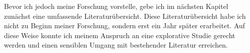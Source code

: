 Bevor ich jedoch meine Forschung vorstelle, gebe ich im nächsten Kapitel zunächst eine umfassende Literaturübersicht. Diese Literaturübersicht habe ich nicht zu Beginn meiner Forschung, sondern erst ein Jahr später erarbeitet. Auf diese Weise konnte ich meinem Anspruch an eine explorative Studie gerecht werden und einen sensiblen Umgang mit bestehender Literatur erreichen.


 
\cleardoublepage